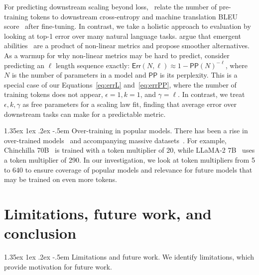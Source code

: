 \documentclass[dvipsnames,11pt]{article}
\makeatletter
\renewcommand\paragraph{\@startsection{paragraph}{4}{\z@}                                     {1.35ex \@plus1ex \@minus.2ex}                                {-.5em}
{\normalfont\normalsize\bfseries}}
\makeatother
\begin{document}
For predicting downstream scaling beyond loss,~\citet{Isik2024ScalingLF} relate the number of pre-training tokens to downstream cross-entropy and machine translation BLEU score~\cite{papineni-etal-2002-bleu} after fine-tuning. 
In contrast, we take a holistic approach to evaluation by looking at top-1 error over many natural language tasks. 
\citet{schaeffer2023emergent} argue that emergent abilities~\cite{wei2022emergent} are a product of non-linear metrics and propose smoother alternatives.
As a warmup for why non-linear metrics may be hard to predict, \citet{schaeffer2023emergent} consider predicting an $\ell$ length sequence exactly: $\textsf{Err}(N, \ell) \approx 1 - \textsf{PP}(N)^{-\ell}$, where $N$ is the number of parameters in a model and $\textsf{PP}$ is its perplexity.
This is a special case of our Equations~\eqref{eq:errL} and~\eqref{eq:errPP}, where the number of training tokens does not appear, $\epsilon = 1, k = 1$, and $\gamma = \ell$.
In contrast, we treat $\epsilon, k, \gamma$ as free parameters for a scaling law fit, finding that average error over downstream tasks can make for a predictable metric.

\paragraph{Over-training in popular models.} There has been a rise in over-trained models~\cite{llama,llama2} and accompanying massive datasets~\cite{rpj,refinedweb,soldaini2024dolma,albalak2024survey}. For example, Chinchilla 70B~\cite{chinchilla} is trained with a token multiplier of 20, while LLaMA-2 7B~\cite{llama2} uses a token multiplier of 290.
In our investigation, we look at token multipliers from 5 to 640 to ensure coverage of popular models and relevance for future models that may be trained on even more tokens.
\vspace*{-2mm}
\section{Limitations, future work, and conclusion}
\label{sec:conclusion}

\paragraph{Limitations and future work.}
We identify limitations, which provide motivation for future work.
\end{document}
